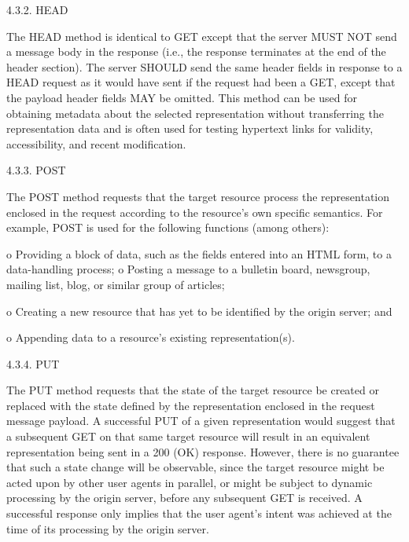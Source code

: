   

4.3.2.  HEAD

   The HEAD method is identical to GET except that the server MUST NOT
   send a message body in the response (i.e., the response terminates at
   the end of the header section).  The server SHOULD send the same
   header fields in response to a HEAD request as it would have sent if
   the request had been a GET, except that the payload header fields
    MAY be omitted.  This method can be used for obtaining
   metadata about the selected representation without transferring the
   representation data and is often used for testing hypertext links for
   validity, accessibility, and recent modification.

   

4.3.3.  POST

   The POST method requests that the target resource process the
   representation enclosed in the request according to the resource's
   own specific semantics.  For example, POST is used for the following
   functions (among others):

   o  Providing a block of data, such as the fields entered into an HTML
      form, to a data-handling process;
      o  Posting a message to a bulletin board, newsgroup, mailing list,
      blog, or similar group of articles;

   o  Creating a new resource that has yet to be identified by the
      origin server; and

   o  Appending data to a resource's existing representation(s).

  


   4.3.4.  PUT

   The PUT method requests that the state of the target resource be
   created or replaced with the state defined by the representation
   enclosed in the request message payload.  A successful PUT of a given
   representation would suggest that a subsequent GET on that same
   target resource will result in an equivalent representation being
   sent in a 200 (OK) response.  However, there is no guarantee that 
   such a state change will be observable, since the target resource
   might be acted upon by other user agents in parallel, or might be
   subject to dynamic processing by the origin server, before any
   subsequent GET is received.  A successful response only implies that
   the user agent's intent was achieved at the time of its processing by
   the origin server.


